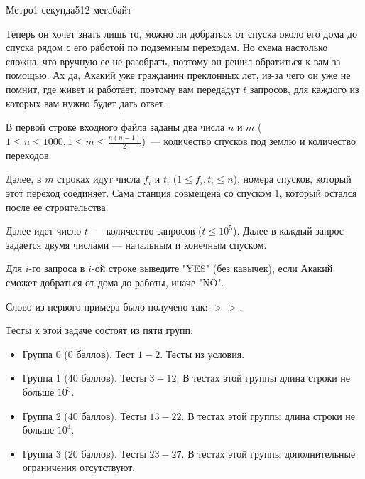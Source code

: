 \begin{problem}{Метро}{}{}{1 секунда}{512 мегабайт}

Теперь он хочет знать лишь то, можно ли добраться от спуска около его дома до спуска рядом с его работой по подземным переходам. Но схема настолько сложна, что вручную ее не разобрать, поэтому он решил обратиться к вам за помощью. Ах да, Акакий уже гражданин преклонных лет, из-за чего он уже не помнит, где живет и работает, поэтому вам передадут $t$ запросов, для каждого из которых вам нужно будет дать ответ. 

\InputFile
В первой строке входного файла заданы два числа $n$ и $m$ ($1 \le n \le 1000, 1 \le m \le \frac{n(n-1)}{2}$)~--- количество спусков под землю и количество переходов.

Далее, в $m$ строках идут числа $f_i$ и $t_i$ ($1 \le f_i, t_i \le n$), номера спусков, который этот переход соединяет. Сама станция совмещена со спуском 1, который остался после ее строительства.

Далее идет число $t$~--- количество запросов ($t \le 10^5$). Далее в каждый запрос задается двумя числами --- начальным и конечным спуском.

\OutputFile
Для $i$-го запроса в $i$-ой строке выведите "YES" (без кавычек), если Акакий сможет добраться от дома до работы, иначе "NO".

\Examples

\begin{example}%
%
\end{example}

\Explanations
Слово из первого примера было получено так:  ->  -> .

\Note
Тесты к этой задаче состоят из пяти групп:

\begin{itemize}
\item Группа 0 (0 баллов). Тест $1-2$. Тесты из условия.
\item Группа 1 (40 баллов). Тесты $3-12$. В тестах этой группы длина строки не больше $10^3$.
\item Группа 2 (40 баллов). Тесты $13-22$. В тестах этой группы длина строки не больше $10^4$.
\item Группа 3 (20 баллов). Тесты $23-27$. В тестах этой группы дополнительные ограничения отсутствуют.
\end{itemize}


\end{problem}


